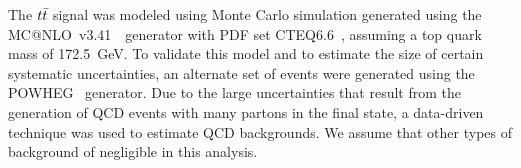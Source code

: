 


The $t\bar{t}$ signal was modeled using Monte Carlo simulation generated using the {\sc MC@NLO}~v3.41~\cite{Frixione:2007vw,Frixione:2003ei,Frixione:2005vw}\
generator with PDF set CTEQ6.6~\cite{Nadolsky:2008zw}, assuming a top quark mass of 172.5~GeV.
To validate this model and to estimate the size of certain systematic uncertainties, an alternate set of events were 
generated using the {\sc POWHEG}~\cite{powheg,Frixione:2007vw} generator.
Due to the large uncertainties that result from the generation of QCD events with many partons in the final state, 
a data-driven technique was used to estimate QCD backgrounds.
We assume that other types of background of negligible in this analysis.




